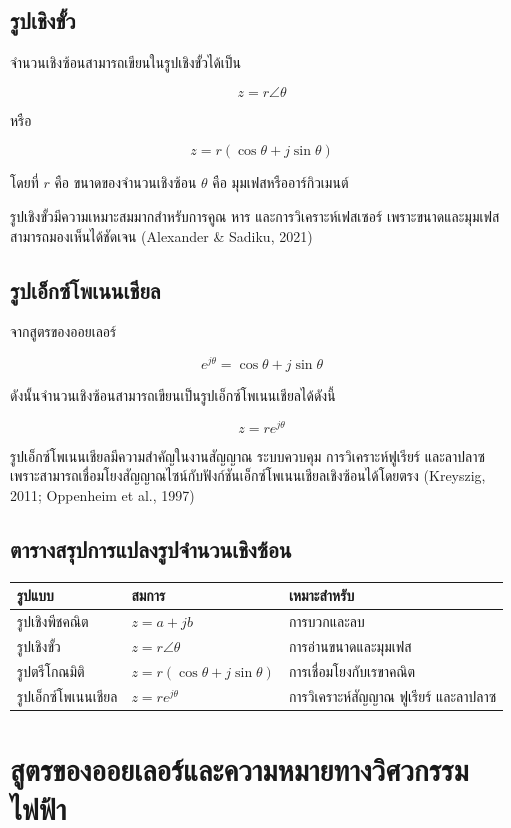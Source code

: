 \subsection{รูปเชิงขั้ว}

จำนวนเชิงซ้อนสามารถเขียนในรูปเชิงขั้วได้เป็น

\[
z=r\angle \theta
\]

หรือ

\[
z=r(\cos\theta+j\sin\theta)
\]

โดยที่  
$r$ คือ ขนาดของจำนวนเชิงซ้อน  
$\theta$ คือ มุมเฟสหรืออาร์กิวเมนต์

รูปเชิงขั้วมีความเหมาะสมมากสำหรับการคูณ หาร และการวิเคราะห์เฟสเซอร์ เพราะขนาดและมุมเฟสสามารถมองเห็นได้ชัดเจน (Alexander \& Sadiku, 2021)

\subsection{รูปเอ็กซ์โพเนนเชียล}

จากสูตรของออยเลอร์

\[
e^{j\theta}=\cos\theta+j\sin\theta
\]

ดังนั้นจำนวนเชิงซ้อนสามารถเขียนเป็นรูปเอ็กซ์โพเนนเชียลได้ดังนี้

\[
z=re^{j\theta}
\]

รูปเอ็กซ์โพเนนเชียลมีความสำคัญในงานสัญญาณ ระบบควบคุม การวิเคราะห์ฟูเรียร์ และลาปลาซ เพราะสามารถเชื่อมโยงสัญญาณไซน์กับฟังก์ชันเอ็กซ์โพเนนเชียลเชิงซ้อนได้โดยตรง (Kreyszig, 2011; Oppenheim et al., 1997)

\subsection{ตารางสรุปการแปลงรูปจำนวนเชิงซ้อน}

\begin{longtable}{L{0.28\textwidth}L{0.30\textwidth}L{0.34\textwidth}}
\toprule
\textbf{รูปแบบ} & \textbf{สมการ} & \textbf{เหมาะสำหรับ} \\
\midrule
รูปเชิงพีชคณิต & $z=a+jb$ & การบวกและลบ \\
รูปเชิงขั้ว & $z=r\angle\theta$ & การอ่านขนาดและมุมเฟส \\
รูปตรีโกณมิติ & $z=r(\cos\theta+j\sin\theta)$ & การเชื่อมโยงกับเรขาคณิต \\
รูปเอ็กซ์โพเนนเชียล & $z=re^{j\theta}$ & การวิเคราะห์สัญญาณ ฟูเรียร์ และลาปลาซ \\
\bottomrule
\end{longtable}

\section{สูตรของออยเลอร์และความหมายทางวิศวกรรมไฟฟ้า}

